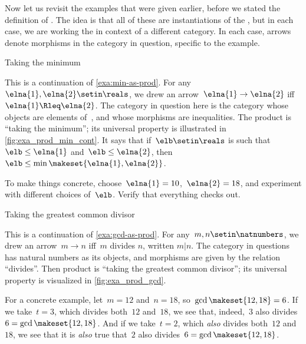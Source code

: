Now let us revisit the examples that were given earlier, before we stated the definition of .
The idea is that all of these are instantiations of the , but in each case, we are working the in context of a different category.
In each case, arrows denote morphisms in the category in question, specific to the example.

\begin{marginfigure}
    \centering
    \caption{Taking the minimum}
    \label{fig:exa_prod_min_cont}
\end{marginfigure}

\begin{example}
    \label{exa:min-as-prod-cont}
    This is a continuation of \cref{exa:min-as-prod}.
    For any~$\elna{1},\elna{2}\setin \reals$, we drew an arrow~$\elna{1}\to \elna{2}$ iff~$\elna{1}\Rleq \elna{2}$.
    The category in question here is the category whose objects are elements of~\reals, and whose morphisms are inequalities.
    The product is ``taking the minimum'';
    its universal property is illustrated in \cref{fig:exa_prod_min_cont}.
    It says that if~$\elb \setin \reals$ is such that~$\elb \leq \elna{1}$ and~$\elb \leq \elna{2}$, then~$\elb \leq \min \makeset{ \elna{1}, \elna{2} }$.

    To make things concrete, choose~$\elna{1} = 10$,~$\elna{2} = 18$, and experiment with different choices of~$\elb$.
    Verify that everything checks out.
\end{example}

\begin{marginfigure}
    \centering
    \caption{Taking the greatest common divisor}
    \label{fig:exa_prod_gcd_cont}
\end{marginfigure}

\begin{example}
    \label{exa:gcd-as-prod-cont}
    This is a continuation of \cref{exa:gcd-as-prod}.
    For any~$m, n \setin \natnumbers$, we drew an arrow~$m \to n$ iff~$m$ divides $n$, written $m | n$.
    The category in questions has natural numbers as its objects, and morphisms are given by the relation ``divides''.
    Then product is ``taking the greatest common divisor''; its universal property is visualized in \cref{fig:exa_prod_gcd}.

    For a concrete example, let~$m = 12$ and~$n = 18$, so~$\gcd \makeset{12, 18 } = 6$.
    If we take~$t = 3$, which divides both~$12$ and~$18$, we see that, indeed,~$3$ also divides~$6 = \gcd \makeset{12, 18 }$.
    And if we take~$t = 2$, which \emph{also} divides both~$12$ and~$18$, we see that it is \emph{also} true that~$2$ also divides~$6 = \gcd \makeset{12, 18 }$.
\end{example}

